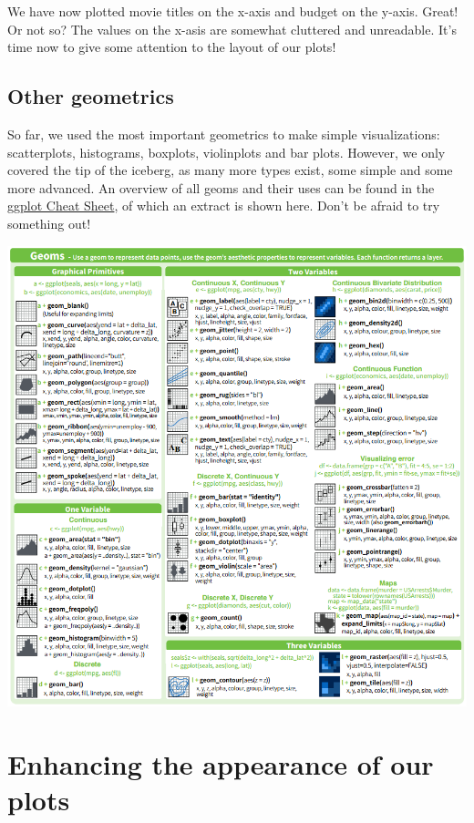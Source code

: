 \documentclass[]{tufte-book}
\begin{document}
We have now plotted movie titles on the x-axis and budget on the y-axis. Great! Or not so? The values on the x-asis are somewhat cluttered and unreadable. It's time now to give some attention to the layout of our plots!

\hypertarget{other-geometrics}{%
\subsection{Other geometrics}\label{other-geometrics}}

So far, we used the most important geometrics to make simple visualizations: scatterplots, histograms, boxplots, violinplots and bar plots. However, we only covered the tip of the iceberg, as many more types exist, some simple and some more advanced. An overview of all geoms and their uses can be found in the \href{https://www.rstudio.com/wp-content/uploads/2015/12/ggplot2-cheatsheet-2.0.pdf}{ggplot Cheat Sheet}, of which an extract is shown here. Don't be afraid to try something out!

\includegraphics{images/geoms.PNG}

\hypertarget{enhancing-the-appearance-of-our-plots}{%
\section{Enhancing the appearance of our plots}\label{enhancing-the-appearance-of-our-plots}}
\end{document}
